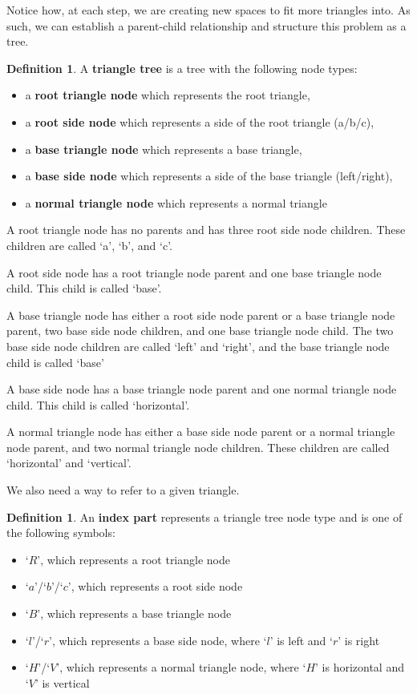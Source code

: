 \documentclass[a4paper,12pt]{article}
\theoremstyle{definition}
\newtheorem{definition}[theorem]{Definition}
\theoremstyle{plain}
\begin{document}
	Notice how, at each step, we are creating new spaces to fit more triangles into. As such, we can establish a parent-child relationship and structure this problem as a tree.
	\begin{definition}
		A \textbf{triangle tree} is a tree with the following node types:\begin{itemize}
			\item a \textbf{root triangle node} which represents the root triangle,
			\item a \textbf{root side node} which represents a side of the root triangle (a/b/c),
			\item a \textbf{base triangle node} which represents a base triangle,
			\item a \textbf{base side node} which represents a side of the base triangle (left/right),
			\item a \textbf{normal triangle node} which represents a normal triangle
		\end{itemize}
		
		A root triangle node has no parents and has three root side node children.
		These children are called `a', `b', and `c'.

		A root side node has a root triangle node parent and one base triangle node child.
		This child is called `base'.

		A base triangle node has either a root side node parent or a base triangle node parent, two base side node children, and one base triangle node child.
		The two base side node children are called `left' and `right', and the base triangle node child is called `base'

		A base side node has a base triangle node parent and one normal triangle node child.
		This child is called `horizontal'.

		A normal triangle node has either a base side node parent or a normal triangle node parent, and two normal triangle node children.
		These children are called `horizontal' and `vertical'.

	\end{definition}

	We also need a way to refer to a given triangle.
	\begin{definition}
		An \textbf{index part} represents a triangle tree node type and is one of the following symbols: \begin{itemize}
			\item `$R$', which represents a root triangle node
			\item `$a$'/`$b$'/`$c$', which represents a root side node
			\item `$B$', which represents a base triangle node
			\item `$l$'/`$r$', which represents a base side node, where `$l$' is left and `$r$' is right
			\item `$H$'/`$V$', which represents a normal triangle node, where `$H$' is horizontal and `$V$' is vertical
		\end{itemize}
	\end{definition}
\end{document}
